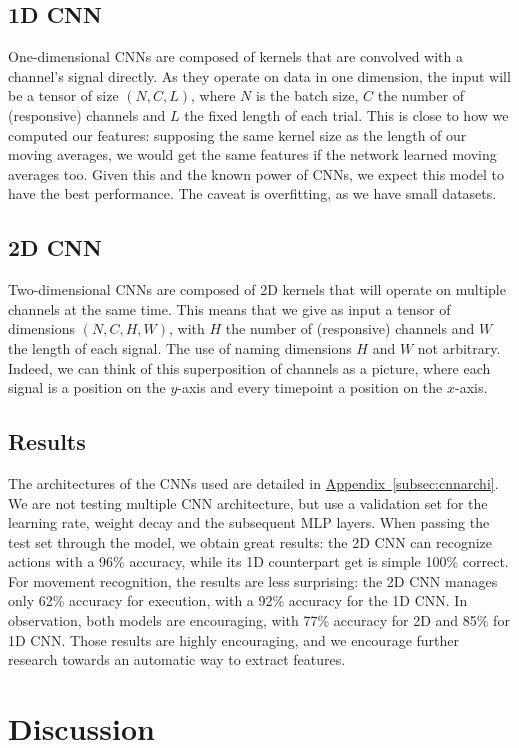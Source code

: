 \documentclass[10pt,conference,compsocconf]{IEEEtran}
\newcommand{\aref}[1]{\hyperref[#1]{Appendix~\ref*{#1}}}
\begin{document}
\subsection{1D CNN}
One-dimensional CNNs are composed of kernels that are convolved with a channel's signal directly. As they operate on data in one dimension, the input will be a tensor of size \((N, C, L)\), where \(N\) is the batch size, \(C\) the number of (responsive) channels and \(L\) the fixed length of each trial. This is close to how we computed our features: supposing the same kernel size as the length of our moving averages, we would get the same features if the network learned moving averages too. Given this and the known power of CNNs, we expect this model to have the best performance. The caveat is overfitting, as we have small datasets.

\subsection{2D CNN}
Two-dimensional CNNs are composed of 2D kernels that will operate on multiple channels at the same time. This means that we give as input a tensor of dimensions \((N, C, H, W)\), with \(H\) the number of (responsive) channels and \(W\) the length of each signal. The use of naming dimensions \(H\) and \(W\) not arbitrary. Indeed, we can think of this superposition of channels as a picture, where each signal is a position on the \(y\)-axis and every timepoint a position on the \(x\)-axis.

\subsection{Results}
The architectures of the CNNs used are detailed in \aref{subsec:cnnarchi}. We are not testing multiple CNN architecture, but use a validation set for the learning rate, weight decay and the subsequent MLP layers. When passing the test set through the model, we obtain great results: the 2D CNN can recognize actions with a 96\% accuracy, while its 1D counterpart get is simple 100\% correct. For movement recognition, the results are less surprising: the 2D CNN manages only 62\% accuracy for execution, with a 92\% accuracy for the 1D CNN. In observation, both models are encouraging, with 77\% accuracy for 2D and 85\% for 1D CNN. Those results are highly encouraging, and we encourage further research towards an automatic way to extract features.

\section{Discussion}
\label{sec:discussion}
\end{document}
